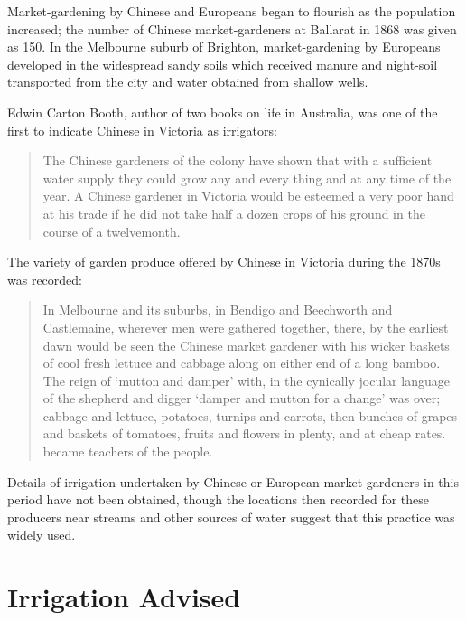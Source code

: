 Market-gardening by Chinese and Europeans began to flourish as the
population increased; the number of Chinese market-gardeners at
Ballarat in 1868 was given as 150.  In the Melbourne suburb
of Brighton, market-gardening by Europeans developed in the widespread
sandy soils which received manure and night-soil transported from the
city and water obtained from shallow wells.

Edwin Carton Booth, author of two books on life in Australia, was one
of the first to indicate Chinese in Victoria as irrigators:
\begin{quote}
	The Chinese gardeners of the colony have shown that with a
	sufficient water supply they could grow any and every thing
	and at any time of the year. A Chinese gardener in Victoria
	would be esteemed a very poor hand at his trade if he did not
	take half a dozen crops of his ground in the course of a
	twelvemonth.
\end{quote}

The variety of garden produce offered by Chinese in Victoria during
the 1870s was recorded:
\begin{quote}
	In Melbourne and its suburbs, in Bendigo and Beechworth and
	Castlemaine, wherever men were gathered together, there, by
	the earliest dawn would be seen the Chinese market gardener
	with his wicker baskets of cool fresh lettuce and cabbage
	along on either end of a long bamboo.  The reign of `mutton
	and damper' with, in the cynically jocular language of the
	shepherd and digger `damper and mutton for a change' was over;
	cabbage and lettuce, potatoes, turnips and carrots, then
	bunches of grapes and baskets of tomatoes, fruits and flowers
	in plenty, and at cheap rates. became teachers of the
	people.
\end{quote}

Details of irrigation undertaken by Chinese or European market
gardeners in this period have not been obtained, though the locations
then recorded for these producers near streams and other sources of
water suggest that this practice was widely used.

\section*{Irrigation Advised}

